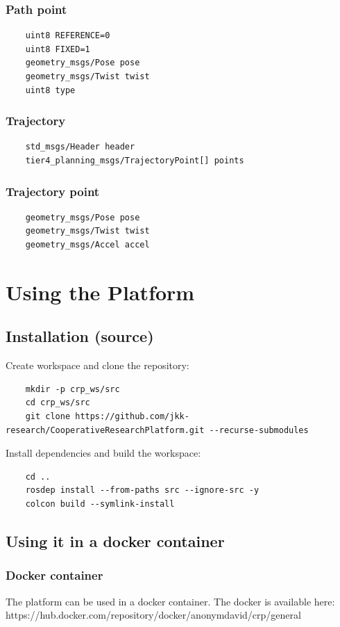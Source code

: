 \documentclass[sn-mathphys-num]{sn-jnl}%
\begin{document}
\subsubsection{Path point}
\begin{lstlisting}
    uint8 REFERENCE=0
    uint8 FIXED=1
    geometry_msgs/Pose pose
    geometry_msgs/Twist twist
    uint8 type
\end{lstlisting}

\subsubsection{Trajectory}
\begin{lstlisting}
    std_msgs/Header header
    tier4_planning_msgs/TrajectoryPoint[] points
\end{lstlisting}

\subsubsection{Trajectory point}
\begin{lstlisting}
    geometry_msgs/Pose pose
    geometry_msgs/Twist twist
    geometry_msgs/Accel accel
\end{lstlisting}

\section{Using the Platform} \label{using_platform}
\subsection{Installation (source)}
Create workspace and clone the repository:
\begin{lstlisting}
    mkdir -p crp_ws/src
    cd crp_ws/src
    git clone https://github.com/jkk-research/CooperativeResearchPlatform.git --recurse-submodules
\end{lstlisting}
Install dependencies and build the workspace:
\begin{lstlisting}
    cd ..
    rosdep install --from-paths src --ignore-src -y
    colcon build --symlink-install
\end{lstlisting}

\subsection{Using it in a docker container}
\subsubsection{Docker container}
The platform can be used in a docker container. The docker is available here: https://hub.docker.com/repository/docker/anonymdavid/crp/general
\end{document}
